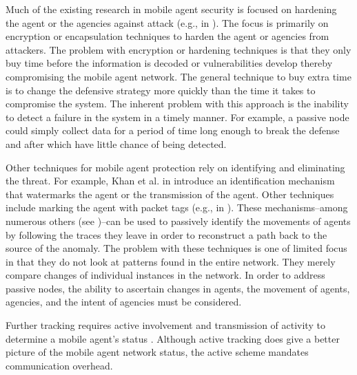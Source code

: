 \documentclass{acm_proc_article-sp}
\begin{document}
Much of the existing research in mobile agent security is focused on hardening the agent or the agencies against attack (e.g., in \cite{lee04, lin10}).  The focus is primarily on encryption or encapsulation techniques to harden the agent or agencies from attackers.  The problem with encryption or hardening techniques is that they only buy time before the information is decoded or vulnerabilities develop thereby compromising the mobile agent network.  The general technique to buy extra time is to change the defensive strategy more quickly than the time it takes to compromise the system.  The inherent problem with this approach is the inability to detect a failure in the system in a timely manner.  For example, a passive node could simply collect data for a period of time long enough to break the defense and after which have little chance of being detected.

Other techniques for mobile agent protection rely on identifying and eliminating the threat.  For example, Khan et al. in \cite{khan08} introduce an identification mechanism that watermarks the agent or the transmission of the agent.  Other techniques include marking the agent with packet tags (e.g., in \cite{duwairi04, goodrich02, peng07}).  These mechanisms--among numerous others (see \cite{bhavani10, gao05})--can be used to passively identify the movements of agents by following the traces they leave in order to reconstruct a path back to the source of the anomaly.  The problem with these techniques is one of limited focus in that they do not look at patterns found in the entire network.  They merely compare changes of individual instances in the network.  In order to address passive nodes, the ability to ascertain changes in agents, the movement of agents, agencies, and the intent of agencies must be considered.

Further tracking requires active involvement and transmission of activity to determine a mobile agent's status \cite{sreedevi09}.  Although active tracking does give a better picture of the mobile agent network status, the active scheme mandates communication overhead.
\end{document}
